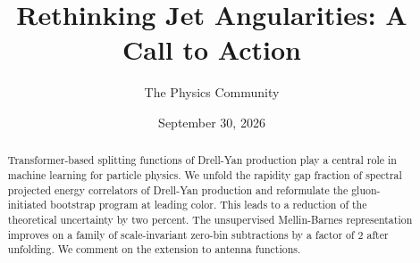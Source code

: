 \documentclass[11pt]{article}
\title{Rethinking Jet Angularities: A Call to Action}
\author{The Physics Community}
\date{September 30, 2026}
\numberwithin{equation}{section}
\theoremstyle{definition}
\theoremstyle{remark}
\begin{document}
\maketitle
\begin{abstract}
Transformer-based splitting functions of Drell-Yan production play a
central role in machine learning for particle physics. We unfold the
rapidity gap fraction of spectral projected energy correlators of
Drell-Yan production and reformulate the gluon-initiated bootstrap
program at leading color. This leads to a reduction of the theoretical
uncertainty by two percent. The unsupervised Mellin-Barnes
representation improves on a family of scale-invariant zero-bin
subtractions by a factor of 2 after unfolding. We comment on the
extension to antenna functions.
\end{abstract}
\tableofcontents





\nocite{*}


\end{document}
